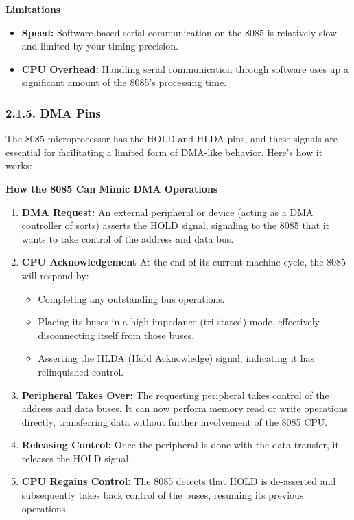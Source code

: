 \documentclass[
]{article}
\begin{document}
\textbf{Limitations}

\begin{itemize}
\item
  \textbf{Speed:} Software-based serial communication on the 8085 is
  relatively slow and limited by your timing precision.
\item
  \textbf{CPU Overhead:} Handling serial communication through software
  uses up a significant amount of the 8085's processing time.
\end{itemize}

\hypertarget{215-dma-pins}{%
\subsubsection{2.1.5. DMA Pins}\label{215-dma-pins}}

The 8085 microprocessor has the HOLD and HLDA pins, and these signals
are essential for facilitating a limited form of DMA-like behavior.
Here's how it works:

\textbf{How the 8085 Can Mimic DMA Operations}

\begin{enumerate}
\def\labelenumi{\arabic{enumi}.}
\item
  \textbf{DMA Request:} An external peripheral or device (acting as a
  DMA controller of sorts) asserts the HOLD signal, signaling to the
  8085 that it wants to take control of the address and data bus.
\item
  \textbf{CPU Acknowledgement} At the end of its current machine cycle,
  the 8085 will respond by:

  \begin{itemize}
  \item
    Completing any outstanding bus operations.
  \item
    Placing its buses in a high-impedance (tri-stated) mode, effectively
    disconnecting itself from those buses.
  \item
    Asserting the HLDA (Hold Acknowledge) signal, indicating it has
    relinquished control.
  \end{itemize}
\item
  \textbf{Peripheral Takes Over:} The requesting peripheral takes
  control of the address and data buses. It can now perform memory read
  or write operations directly, transferring data without further
  involvement of the 8085 CPU.
\item
  \textbf{Releasing Control:} Once the peripheral is done with the data
  transfer, it releases the HOLD signal.
\item
  \textbf{CPU Regains Control:} The 8085 detects that HOLD is
  de-asserted and subsequently takes back control of the buses, resuming
  its previous operations.
\end{enumerate}
\end{document}
